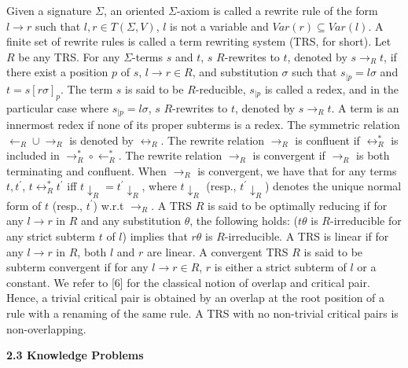 Given a signature $\Sigma$, an oriented $\Sigma$-axiom is called a rewrite rule of the form $l\rightarrow r$ such that $l,r\in T(\Sigma,V)$, $l$ is not a variable and $\mathit{Var}(r)\subseteq\mathit{Var}(l)$. A finite set of rewrite rules is called a term rewriting system (TRS, for short). Let $R$ be any TRS. For any $\Sigma$-terms $s$ and $t$, $s$ $R$-rewrites to $t$, denoted by $s\rightarrow_{R}t$, if there exist a position $p$ of $s$, $l\rightarrow r\in R$, and substitution $\sigma$ such that $s_{|p}=l\sigma$ and $t=s[r\sigma]_{p}$. The term $s$ is said to be $R$-reducible, $s_{|p}$ is called a redex, and in the particular case where $s_{|p}=l\sigma$, $s$ $R$-rewrites to $t$, denoted by $s\rightarrow_{R}t$. A term is an innermost redex if none of its proper subterms is a redex. The symmetric relation $\leftarrow_{R}\cup\rightarrow_{R}$ is denoted by $\longleftrightarrow_{R}$. The rewrite relation $\rightarrow_{R}$ is confluent if $\longleftrightarrow_{R}^{*}$ is included in $\rightarrow_{R}^{*}\circ\leftarrow_{R}^{*}$. The rewrite relation $\rightarrow_{R}$ is convergent if $\rightarrow_{R}$ is both terminating and confluent. When $\rightarrow_{R}$ is convergent, we have that for any terms $t,t^{\prime}$, $t\longleftrightarrow_{R}^{*}t^{\prime}$ iff $t{\downarrow}_{R}=t^{\prime}{\downarrow}_{R}$, where $t{\downarrow}_{R}$ (resp., $t^{\prime}{\downarrow}_{R}$) denotes the unique normal form of $t$ (resp., $t^{\prime}$) w.r.t $\rightarrow_{R}$. A TRS $R$ is said to be optimally reducing if for any $l\rightarrow r$ in $R$ and any substitution $\theta$, the following holds: ($t\theta$ is $R$-irreducible for any strict subterm $t$ of $l$) implies that $r\theta$ is $R$-irreducible. A TRS is linear if for any $l\rightarrow r$ in $R$, both $l$ and $r$ are linear. A convergent TRS $R$ is said to be subterm convergent if for any $l\rightarrow r\in R$, $r$ is either a strict subterm of $l$ or a constant. We refer to [6] for the classical notion of overlap and critical pair. Hence, a trivial critical pair is obtained by an overlap at the root position of a rule with a renaming of the same rule. A TRS with no non-trivial critical pairs is non-overlapping.\par
 
 
 
 
\par\medskip\noindent\textbf{2.3 Knowledge Problems}\par
 
